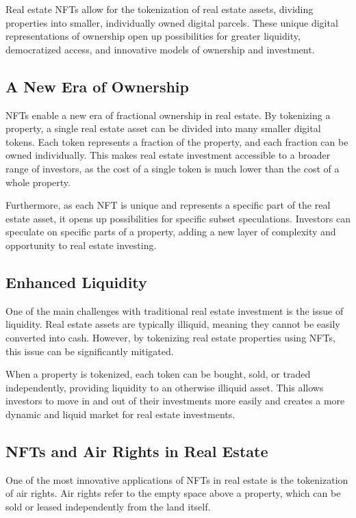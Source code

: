 \documentclass[11pt]{article}
\begin{document}
Real estate NFTs allow for the tokenization of real estate assets, dividing properties into smaller, individually owned digital parcels. These unique digital representations of ownership open up possibilities for greater liquidity, democratized access, and innovative models of ownership and investment.


\subsection{A New Era of Ownership}

NFTs enable a new era of fractional ownership in real estate. By tokenizing a property, a single real estate asset can be divided into many smaller digital tokens. Each token represents a fraction of the property, and each fraction can be owned individually. This makes real estate investment accessible to a broader range of investors, as the cost of a single token is much lower than the cost of a whole property.


Furthermore, as each NFT is unique and represents a specific part of the real estate asset, it opens up possibilities for specific subset speculations. Investors can speculate on specific parts of a property, adding a new layer of complexity and opportunity to real estate investing.


\subsection{Enhanced Liquidity}

One of the main challenges with traditional real estate investment is the issue of liquidity. Real estate assets are typically illiquid, meaning they cannot be easily converted into cash. However, by tokenizing real estate properties using NFTs, this issue can be significantly mitigated.


When a property is tokenized, each token can be bought, sold, or traded independently, providing liquidity to an otherwise illiquid asset. This allows investors to move in and out of their investments more easily and creates a more dynamic and liquid market for real estate investments.


\subsection{NFTs and Air Rights in Real Estate}

One of the most innovative applications of NFTs in real estate is the tokenization of air rights. Air rights refer to the empty space above a property, which can be sold or leased independently from the land itself.
\end{document}
